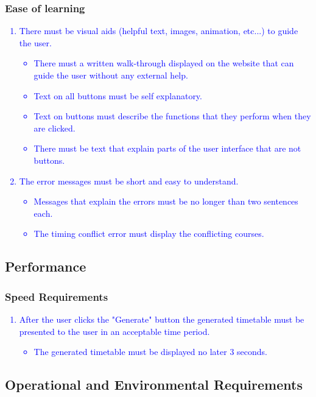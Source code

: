 \documentclass[12pt]{article}
\begin{document}
\subsubsection{Ease of learning}
\textcolor{blue}{
\begin{enumerate}
    \item There must be visual aids (helpful text, images, animation, etc...) to guide the user.
    \begin{itemize}
        \item There must a written walk-through displayed on the website that can guide the user without any external help.
        \item Text on all buttons must be self explanatory.
        \item Text on buttons must describe the functions that they perform when they are clicked.
        \item There must be text that explain parts of the user interface that are not buttons.
    \end{itemize}
    \item The error messages must be short and easy to understand.
    \begin{itemize}
        \item Messages that explain the errors must be no longer than two sentences each.
        \item The timing conflict error must display the conflicting courses.
    \end{itemize}
\end{enumerate}
}
\subsection{Performance}
\subsubsection{Speed Requirements}
\textcolor{blue}{
\begin{enumerate}
    \item After the user clicks the "Generate" button the generated timetable must be presented to the user in an acceptable time period.
    \begin{itemize}
        \item The generated timetable must be displayed no later 3 seconds.
    \end{itemize}
\end{enumerate}
}
\subsection{Operational and Environmental Requirements}
\end{document}
